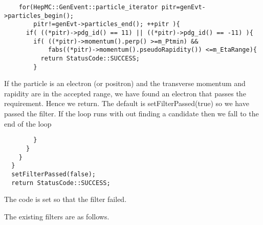 \documentclass[11pt]{article}
\begin{document}
\begin{verbatim}
    for(HepMC::GenEvent::particle_iterator pitr=genEvt->particles_begin();
        pitr!=genEvt->particles_end(); ++pitr ){
      if( ((*pitr)->pdg_id() == 11) || ((*pitr)->pdg_id() == -11) ){
        if( ((*pitr)->momentum().perp() >=m_Ptmin) && 
            fabs((*pitr)->momentum().pseudoRapidity()) <=m_EtaRange){
          return StatusCode::SUCCESS;
        }
\end{verbatim}
If the particle is an electron (or positron) and the   transverse momentum
and rapidity are in the accepted range, we have found an electron that
passes the requirement. Hence we return. The default is
setFilterPassed(true) so we have passed the filter. If the loop runs
with out finding a candidate then we fall to the end of the loop

\begin{verbatim}
        }
      }
    }   
  }
  setFilterPassed(false);
  return StatusCode::SUCCESS;
\end{verbatim}

The code is set so that the filter failed.

The existing filters are as follows.
\end{document}
